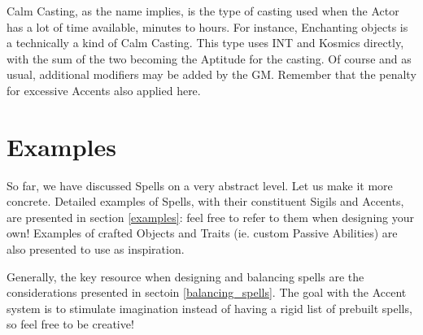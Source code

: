 Calm Casting, as the name implies, is the type of casting used when the Actor has a lot of time available, minutes to hours. For instance, Enchanting objects is a technically a kind of Calm Casting. This type uses INT and Kosmics directly, with the sum of the two becoming the Aptitude for the casting. Of course and as usual, additional modifiers may be added by the GM. Remember that the penalty for excessive Accents also applied here.

\section{Examples}

So far, we have discussed Spells on a very abstract level. Let us make it more concrete. Detailed examples of Spells, with their constituent Sigils and Accents, are presented in section \ref{examples}: feel free to refer to them when designing your own! Examples of crafted Objects and Traits (ie. custom Passive Abilities) are also presented to use as inspiration.

Generally, the key resource when designing and balancing spells are the considerations presented in sectoin \ref{balancing_spells}. The goal with the Accent system is to stimulate imagination instead of having a rigid list of prebuilt spells, so feel free to be creative!














